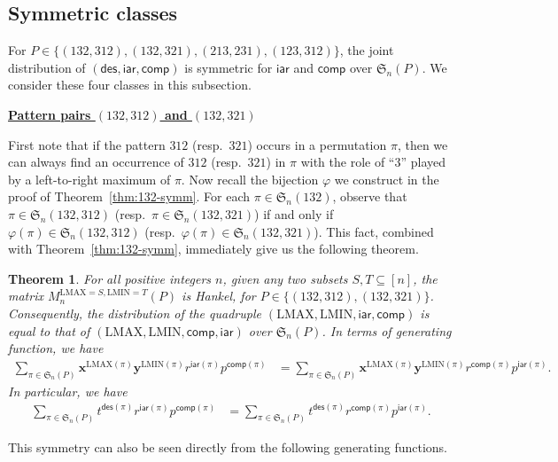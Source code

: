 \documentclass[12pt]{amsart}
\numberwithin{equation}{section}
\theoremstyle{plain}
\newtheorem{theorem}{Theorem}[section]
\theoremstyle{definition}
\def\des{\mathsf{des}}
\def\S{\mathfrak{S}}
\def\iar{\mathsf{iar}}
\def\comp{\mathsf{comp}}
\def\LMAX{\mathrm{LMAX}}
\def\LMIN{\mathrm{LMIN}}
\begin{document}
\subsection{Symmetric classes} 
For $P\in\{(132,312),(132,321), (213,231), (123,312)\}$, the joint distribution of $(\des,\iar,\comp)$ is symmetric for $\iar$ and $\comp$ over $\S_n(P)$. We consider these four classes in this subsection. 

\medskip
\noindent \underline{\bf Pattern pairs $(132,312)$ and $(132,321)$}
\medskip

First note that if the pattern $312$ (resp.~$321$) occurs in a permutation $\pi$, then we can always find an occurrence of $312$ (resp.~$321$) in $\pi$ with the role of ``$3$'' played by a left-to-right maximum of $\pi$. Now recall the bijection $\varphi$ we construct in the proof of Theorem~\ref{thm:132-symm}. For each $\pi\in\S_n(132)$, observe that $\pi\in\S_n(132,312)$ (resp.~$\pi\in\S_n(132,321)$) if and only if $\varphi(\pi)\in\S_n(132,312)$ (resp.~$\varphi(\pi)\in\S_n(132,321)$). This fact, combined with Theorem~\ref{thm:132-symm}, immediately give us the following theorem.

\begin{theorem}\label{thm:132-312 and 132-321 symm}
For all positive integers $n$, given any two subsets $S,T\subseteq [n]$, the matrix $M_n^{\LMAX=S,\LMIN=T}(P)$ is Hankel, for $P\in\{(132,312), (132,321)\}$. Consequently, the distribution of the quadruple $(\LMAX, \LMIN, \iar, \comp)$ is equal to that of $(\LMAX, \LMIN, \comp, \iar)$ over $\S_n(P)$. In terms of generating function, we have
\begin{align*} %
\sum_{\pi\in\S_n(P)}\mathbf{x}^{\LMAX(\pi)}\mathbf{y}^{\LMIN(\pi)}r^{\iar(\pi)}p^{\comp(\pi)} &= \sum_{\pi\in\S_n(P)}\mathbf{x}^{\LMAX(\pi)}\mathbf{y}^{\LMIN(\pi)}r^{\comp(\pi)}p^{\iar(\pi)}.
\end{align*}
In particular, we have
\begin{align*} %
\sum_{\pi\in\S_n(P)}t^{\des(\pi)}r^{\iar(\pi)}p^{\comp(\pi)} &= \sum_{\pi\in\S_n(P)}t^{\des(\pi)}r^{\comp(\pi)}p^{\iar(\pi)}.
\end{align*}
\end{theorem}
This symmetry can also be seen directly from the following generating functions.
\end{document}
